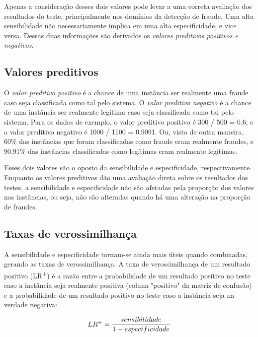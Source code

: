 Apenas a consideração desses dois valores pode levar a uma correta avaliação dos resultados do teste, principalmente nos domínios da detecção de fraude. Uma alta sensibilidade não necessariamente implica em uma alta especificidade, e vice versa. Dessas duas informações são derivados os \emph{valores preditivos positivos e negativos}.

\subsection{Valores preditivos}

O \emph{valor preditivo positivo} é a chance de uma instância ser realmente uma fraude caso seja classificada como tal pelo sistema. O \emph{valor preditivo negativo} é a chance de uma instância ser realmente legítima caso seja classificada como tal pelo sistema. Para os dados de exemplo, o valor preditivo positivo é 300 / 500 = 0.6; e o valor preditivo negativo é 1000 / 1100 = 0.9091. Ou, visto de outra maneira, 60\% das instâncias que foram classificadas como fraude eram realmente fraudes, e 90.91\% das instâncias classificadas como legítimas eram realmente legítimas.

Esses dois valores são o oposto da sensibilidade e especificidade, respectivamente. Enquanto os valores preditivos dão uma avaliação direta sobre os resultados dos testes, a sensibilidade e especificidade não são afetadas pela proporção dos valores nas instâncias, ou seja, não são alteradas quando há uma alteração na proporção de fraudes.

\subsection{Taxas de verossimilhança}

A sensibilidade e especificidade tornam-se ainda mais úteis quando combinadas, gerando as taxas de verossimilhança. A taxa de verossimilhança de um resultado positivo (LR\textsuperscript{+}) é a razão entre a probabilidade de um resultado positivo no teste caso a instância seja realmente positiva (coluna "positivo" da matriz de confusão) e a probabilidade de um resultado positivo no teste caso a instância seja na verdade negativa:

\begin{equation}
    \vspace{2mm}
    LR^{+}=\frac{sensibilidade}{1 - especificidade}
    \vspace{2mm}
\end{equation}

